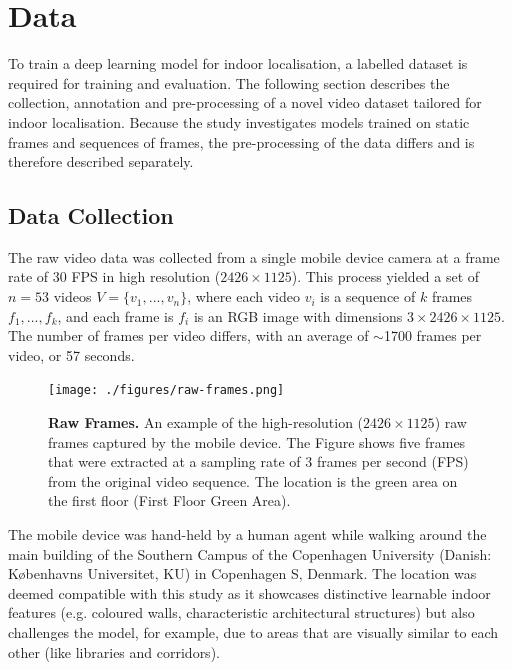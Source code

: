 \documentclass[a4paper]{article}
\begin{document}
\section{Data}
\label{sec:data}

To train a deep learning model for indoor localisation, a labelled dataset is
required for training and evaluation. The following section describes the
collection, annotation and pre-processing of a novel video dataset tailored for
indoor localisation. Because the study investigates models trained on static
frames and sequences of frames, the pre-processing of the data differs and is
therefore described separately.

\subsection{Data Collection} %
\label{sub:data-collection}

The raw video data was collected from a single mobile device camera at a frame
rate of 30 FPS in high resolution ($2426\times 1125$). This process yielded a
set of $n=53$ videos $V = \{v_1, ..., v_n\}$, where each video $v_i$ is a
sequence of $k$ frames $f_1, ..., f_k$, and each frame is $f_i$ is an RGB image
with dimensions $3 \times 2426 \times 1125$. The number of frames per video
differs, with an average of $\sim$1700 frames per video, or 57 seconds. 

\begin{figure}
  \begin{center}
    \texttt{[image: ./figures/raw-frames.png]}
  \end{center}
  \caption{\textbf{Raw Frames.} An example of the high-resolution ($2426\times
    1125$) raw frames captured by the mobile device. The Figure shows five
    frames that were extracted at a sampling rate of 3 frames per second (FPS)
    from the original video sequence. The location is the green area on the
  first floor (First Floor Green Area).}
  \label{fig:raw-frames}
\end{figure}

The mobile device was hand-held by a human agent while walking around the main
building of the Southern Campus of the Copenhagen University (Danish:
K\o{}benhavns Universitet, KU) in Copenhagen S, Denmark. The location was deemed
compatible with this study as it showcases distinctive learnable indoor features
(e.g. coloured walls, characteristic architectural structures) but also
challenges the model, for example, due to areas that are visually similar to
each other (like libraries and corridors).
\end{document}
